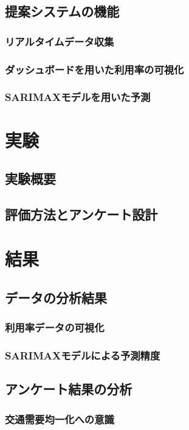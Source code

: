 \documentclass[uplatex,a4j,10pt,titlepage]{jsarticle}
\begin{document}
\subsection{提案システムの機能}
\subsubsection{リアルタイムデータ収集}
\subsubsection{ダッシュボードを用いた利用率の可視化}
\subsubsection{SARIMAXモデルを用いた予測}

\section{実験}
\subsection{実験概要}
\subsection{評価方法とアンケート設計}

\section{結果}
\subsection{データの分析結果}
\subsubsection{利用率データの可視化}
\subsubsection{SARIMAXモデルによる予測精度}
\subsection{アンケート結果の分析}
\subsubsection{交通需要均一化への意識}
\end{document}
